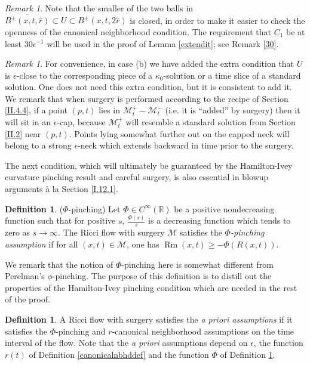 \documentclass[12pt]{amsart}
\newcommand{\M}{{\mathcal M}}
\newcommand{\R}{{\mathbb R}}
\newcommand{\Rm}{\operatorname{Rm}}
\newcommand{\eps}{\epsilon}
\newcommand{\ol}{\overline}
\numberwithin{equation}{section}
\theoremstyle{plain}
\theoremstyle{definition}
\newtheorem{definition}[equation]{Definition}
\theoremstyle{remark}
\newtheorem{remark}[equation]{Remark}
\begin{document}
\begin{remark}
Note that the smaller of the 
two balls in $\ol{B^\pm(x,t,\hat r)}\subset U\subset B^\pm(x,t,2\hat r)$ is closed, 
in order to 
make it easier to check the openness of the canonical neighborhood condition.
The requirement that $C_1$ be at least $30 \epsilon^{-1}$ will be used
in the proof of Lemma \ref{extendit}; see Remark \ref{30}.
\end{remark}

\begin{remark}
For convenience, in case (b) we have added the
extra condition that $U$ is $\epsilon$-close to the
corresponding piece of a $\kappa_0$-solution or 
a time slice of a standard solution.
One does not need this
extra condition, but it is consistent to add it.
We remark that when surgery is performed according to the recipe
of Section \ref{II.4.4}, if a point $(p,t)$ lies in $\M_t^+   -  \M_t^-$ (i.e.
it  is ``added'' by surgery) then
it will sit in an $\eps$-cap, because $\M_t^+$ will resemble
a standard solution from Section \ref{II.2} near $(p,t)$.   Points lying
somewhat further out on the capped neck will belong to a strong 
$\eps$-neck which extends backward in time prior to the surgery. 
 \end{remark} 

The next condition, which will ultimately be guaranteed by the
Hamilton-Ivey curvature pinching result and careful surgery, 
is also essential in blowup arguments \`a la Section
\ref{I.12.1}.
\begin{definition}($\Phi$-pinching)
\label{phipinchingdef}
Let  $\Phi \in C^\infty(\R)$ be a positive nondecreasing 
function such that for positive $s$,
$\frac{\Phi(s)}{s}$ is a decreasing function which tends to zero
as $s \rightarrow \infty$.  The Ricci flow with surgery $\M$
satisfies the {\em $\Phi$-pinching assumption} if for all
$(x,t) \in \M$, one has $\Rm(x,t) \geq -\Phi(R(x,t))$.
\end{definition}

We remark that the notion of $\Phi$-pinching here is somewhat
different from Perelman's $\phi$-pinching.  The purpose of 
this definition is to distill out the properties of the
Hamilton-Ivey pinching condition which are needed in the rest of the
proof.  

\begin{definition} \label{apriori}
A Ricci flow with surgery satisfies the {\em {\it a priori} assumptions}
if it satisfies the $\Phi$-pinching and $r$-canonical
neighborhood assumptions
on the time interval of the flow. Note that
the {\it a priori} assumptions depend on $\epsilon$, the function $r(t)$ of
Definition \ref{canonicalnbhddef} 
and the function $\Phi$ of Definition \ref{phipinchingdef}.
\end{definition}
    
\end{document}
